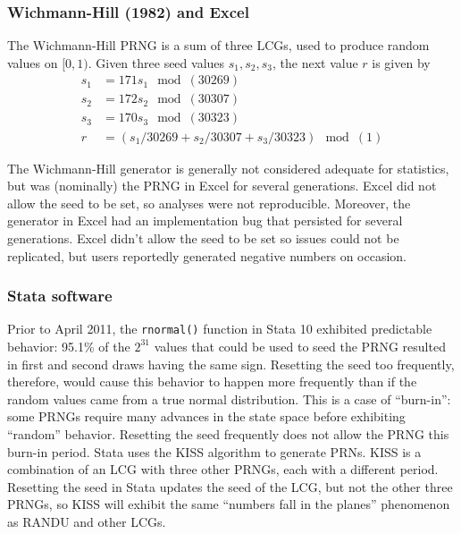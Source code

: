 \documentclass[12pt]{article}
\newcommand{\todo}[1]{{\color{red}{TO DO: \sc #1}}}
\begin{document}
\subsubsection{Wichmann-Hill (1982) \todo{cite} and Excel}
The Wichmann-Hill PRNG is a sum of three LCGs, used to produce random values on $[0, 1)$.
Given three seed values $s_1, s_2, s_3$, the next value $r$ is given by
\begin{align*}
s_1 &= 171 s_1\mod(30269) \\
s_2 &= 172 s_2 \mod(30307) \\
s_3 &= 170 s_3 \mod(30323) \\
r &= (s_1/30269 + s_2/30307 + s_3/30323) \mod(1)
\end{align*}

The Wichmann-Hill generator is generally not considered adequate for statistics, but was (nominally) the PRNG in Excel for several generations. 
Excel did not allow the seed to be set, so analyses were not reproducible.
Moreover, the generator in Excel had an implementation bug that persisted for several generations.
Excel didn't allow the seed to be set so issues could not be replicated, but users reportedly generated negative numbers on occasion.
\todo{cite McCullough, B.D., 2008. Microsoft Excel?s ?Not The Wichmann?Hill? random number generators}

\subsubsection{Stata software}
Prior to April 2011, the \texttt{rnormal()} function in Stata 10 exhibited predictable behavior:
95.1\% of the $2^{31}$ values that could be used to seed the PRNG resulted in first and second draws having the same sign.
Resetting the seed too frequently, therefore, would cause this behavior to happen more frequently than if the 
random values came from a true normal distribution.
This is a case of ``burn-in'': some PRNGs require many advances in the state space before exhibiting ``random'' behavior.
Resetting the seed frequently does not allow the PRNG this burn-in period.
Stata uses the KISS algorithm to generate PRNs.
KISS is a combination of an LCG with three other PRNGs, each with a different period.
 \todo{describe KISS and cite Marsaglia}
Resetting the seed in Stata updates the seed of the LCG, but not the other three PRNGs, so KISS will exhibit the same
``numbers fall in the planes'' phenomenon as RANDU and other LCGs.
\todo{cite Ozier: "Perils of Simulation..."}
\end{document}
